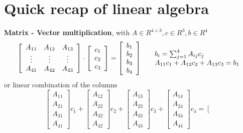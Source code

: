 \documentclass[10pt]{report}
\begin{document}
\section{Quick recap of linear algebra}
\begin{list}{}{}
	\item \textbf{Matrix - Vector multiplication}, with $A\in R^{4\times 3}, c\in R^3, b\in R^4$
	$$\left[\begin{array}{c c c}
		A_{11} & A_{12} & A_{13}\\
		\vdots & \vdots & \vdots\\
		A_{41} & A_{42} & A_{43}
	\end{array}\right]\cdot \left[\begin{array}{c}
		c_1\\c_2\\c_3
	\end{array}\right] = \left[\begin{array}{c}
		b_1\\b_2\\b_3\\b_4
	\end{array}\right]\:\:\:\:\:\:\begin{array}{l}
		b_i = \sum_{j=1}^4 A_{ij}c_j\\
		A_{11}c_1 + A_{12}c_2 + A_{13}c_3 = b_1
	\end{array}$$
	or linear combination of the columns
	$$\left[\begin{array}{c}
	A_{11}\\A_{21}\\A_{31}\\A_{41}
	\end{array}\right]c_1 + \left[\begin{array}{c}
	A_{12}\\A_{22}\\A_{32}\\A_{42}
	\end{array}\right]c_2 + \left[\begin{array}{c}
	A_{13}\\A_{23}\\A_{33}\\A_{43}
	\end{array}\right]c_3 + \left[\begin{array}{c}
	A_{14}\\A_{24}\\A_{34}\\A_{44}
	\end{array}\right]c_4 = \left[\begin{array}{c}

\end{array}$$
\end{list}
\end{document}

